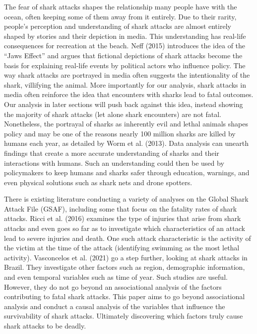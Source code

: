 \documentclass[
  letterpaper,
  DIV=11,
  numbers=noendperiod]{scrartcl}
\begin{document}
The fear of shark attacks shapes the relationship many people have with
the ocean, often keeping some of them away from it entirely. Due to
their rarity, people's perception and understanding of shark attacks are
almost entirely shaped by stories and their depiction in media. This
understanding has real-life consequences for recreation at the beach.
Neff (2015) introduces the idea of the ``Jaws Effect'' and argues that
fictional depictions of shark attacks become the basis for explaining
real-life events by political actors who influence policy. The way shark
attacks are portrayed in media often suggests the intentionality of the
shark, villifying the animal. More importantly for our analysis, shark
attacks in media often reinforce the idea that encounters with sharks
lead to fatal outcomes. Our analysis in later sections will push back
against this idea, instead showing the majority of shark attacks (let
alone shark encounters) are not fatal. Nonetheless, the portrayal of
sharks as inherently evil and lethal animals shapes policy and may be
one of the reasons nearly 100 million sharks are killed by humans each
year, as detailed by Worm et al. (2013). Data analysis can unearth
findings that create a more accurate understanding of sharks and their
interactions with humans. Such an understanding could then be used by
policymakers to keep humans and sharks safer through education,
warnings, and even physical solutions such as shark nets and drone
spotters.

There is existing literature conducting a variety of analyses on the
Global Shark Attack File (GSAF), including some that focus on the
fatality rates of shark attacks. Ricci et al. (2016) examines the type
of injuries that arise from shark attacks and even goes so far as to
investigate which characteristics of an attack lead to severe injuries
and death. One such attack characteristic is the activity of the victim
at the time of the attack (identifying swimming as the most lethal
activity). Vasconcelos et al. (2021) go a step further, looking at shark
attacks in Brazil. They investigate other factors such as region,
demographic information, and even temporal variables such as time of
year. Such studies are useful. However, they do not go beyond an
associational analysis of the factors contributing to fatal shark
attacks. This paper aims to go beyond associational analysis and conduct
a causal analysis of the variables that influence the survivability of
shark attacks. Ultimately discovering which factors truly cause shark
attacks to be deadly.
\end{document}
